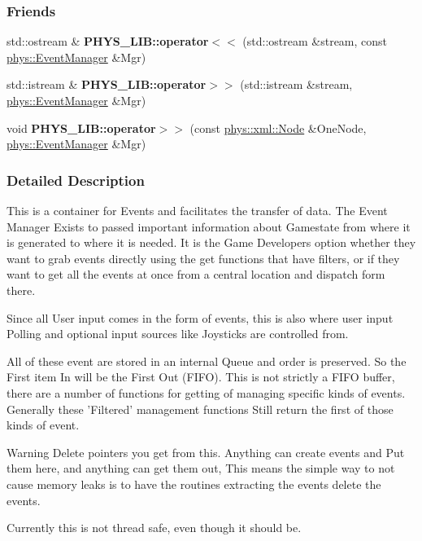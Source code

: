 \subsubsection*{Friends}
\begin{DoxyCompactItemize}
\item 
\hypertarget{classphys_1_1EventManager_ad68113acdef0b428e8180ee4192aca09}{
std::ostream \& {\bfseries PHYS\_\-LIB::operator$<$$<$} (std::ostream \&stream, const \hyperlink{classphys_1_1EventManager}{phys::EventManager} \&Mgr)}
\label{da/dde/classphys_1_1EventManager_ad68113acdef0b428e8180ee4192aca09}

\item 
\hypertarget{classphys_1_1EventManager_ac32b5a1ad8a8171298bd544eda444865}{
std::istream \& {\bfseries PHYS\_\-LIB::operator$>$$>$} (std::istream \&stream, \hyperlink{classphys_1_1EventManager}{phys::EventManager} \&Mgr)}
\label{da/dde/classphys_1_1EventManager_ac32b5a1ad8a8171298bd544eda444865}

\item 
\hypertarget{classphys_1_1EventManager_a04e666d9104e325839dc9a6e63cd3c6f}{
void {\bfseries PHYS\_\-LIB::operator$>$$>$} (const \hyperlink{classphys_1_1xml_1_1Node}{phys::xml::Node} \&OneNode, \hyperlink{classphys_1_1EventManager}{phys::EventManager} \&Mgr)}
\label{da/dde/classphys_1_1EventManager_a04e666d9104e325839dc9a6e63cd3c6f}

\end{DoxyCompactItemize}


\subsubsection{Detailed Description}
This is a container for Events and facilitates the transfer of data. The Event Manager Exists to passed important information about Gamestate from where it is generated to where it is needed. It is the Game Developers option whether they want to grab events directly using the get functions that have filters, or if they want to get all the events at once from a central location and dispatch form there. \par
 Since all User input comes in the form of events, this is also where user input Polling and optional input sources like Joysticks are controlled from. \par
 All of these event are stored in an internal Queue and order is preserved. So the First item In will be the First Out (FIFO). This is not strictly a FIFO buffer, there are a number of functions for getting of managing specific kinds of events. Generally these 'Filtered' management functions Still return the first of those kinds of event. \begin{DoxyWarning}{Warning}
Delete pointers you get from this. Anything can create events and Put them here, and anything can get them out, This means the simple way to not cause memory leaks is to have the routines extracting the events delete the events. 

Currently this is not thread safe, even though it should be. 
\end{DoxyWarning}



